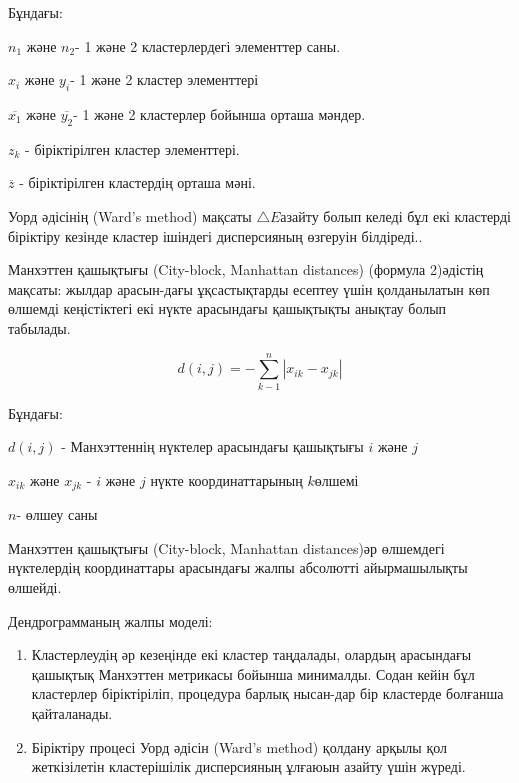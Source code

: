 Бұндағы:

$n_1$ және $n_2$- 1 және 2 кластерлердегі элементтер
саны.

$x_i$ және $y_i$- 1 және 2 кластер элементтері

$\overline{x_1}$ және $\overline{y_2}$- 1 және 2 кластерлер бойынша орташа
мәндер.

$z_k$ - біріктірілген кластер элементтері.

$\overline{z}$ - біріктірілген кластердің орташа
мәні.

Уорд әдісінің (Ward's method) мақсаты $\triangle E$азайту болып келеді бұл екі
кластерді біріктіру кезінде кластер ішіндегі дисперсияның өзгеруін
білдіреді..

Манхэттен қашықтығы (City-block, Manhattan distances) (формула 2)әдістің
мақсаты: жылдар арасын-дағы ұқсастықтарды есептеу үшін қолданылатын көп
өлшемді кеңістіктегі екі нүкте арасындағы қашықтықты анықтау болып
табылады.

\begin{equation}
  d(i,j) = - \sum_{k-1}^n |x_{ik} - x_{jk}|
\end{equation}

Бұндағы:

$d(i,j)$ - Манхэттеннің нүктелер арасындағы
қашықтығы $i$ және $j$

$x_{ik}$ және $x_{jk}$ - $i$ және $j$ нүкте координаттарының $k$өлшемі

$n$- өлшеу саны

Манхэттен қашықтығы (City-block, Manhattan distances)әр өлшемдегі
нүктелердің координаттары арасындағы жалпы абсолютті айырмашылықты
өлшейді.

Дендрограмманың жалпы моделі:

\begin{enumerate}
\def\labelenumi{\arabic{enumi}.}\setlength{\itemindent}{1cm}
\item
  Кластерлеудің әр кезеңінде екі кластер таңдалады, олардың арасындағы
  қашықтық Манхэттен метрикасы бойынша минималды. Содан кейін бұл
  кластерлер біріктіріліп, процедура барлық нысан-дар бір кластерде
  болғанша қайталанады.
\item
  Біріктіру процесі Уорд әдісін (Ward's method) қолдану арқылы қол
  жеткізілетін кластерішілік дисперсияның ұлғаюын азайту үшін жүреді.
\end{enumerate}

